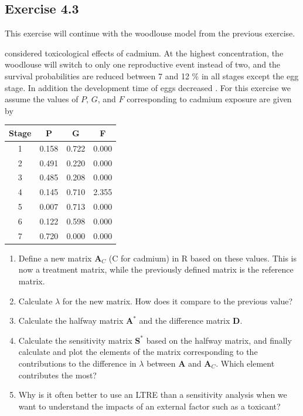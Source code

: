 \documentclass[
]{book}
\begin{document}
\hypertarget{exercise-4.3}{%
\subsection*{Exercise 4.3}\label{exercise-4.3}}

This exercise will continue with the woodlouse model from the previous exercise.

\citet{Kammenga1} considered toxicological effects of cadmium. At the highest concentration, the woodlouse will switch to only one reproductive event instead of two, and the survival probabilities are reduced between 7 and 12 \% in all stages except the egg stage. In addition the development time of eggs decreased \citep{Kammenga1}. For this exercise we assume the values of \(P\), \(G\), and \(F\) corresponding to cadmium exposure are given by

\begin{tabular}{c|c|c|c}
\hline
Stage & P & G & F\\
\hline
1 & 0.158 & 0.722 & 0.000\\
\hline
2 & 0.491 & 0.220 & 0.000\\
\hline
3 & 0.485 & 0.208 & 0.000\\
\hline
4 & 0.145 & 0.710 & 2.355\\
\hline
5 & 0.007 & 0.713 & 0.000\\
\hline
6 & 0.122 & 0.598 & 0.000\\
\hline
7 & 0.720 & 0.000 & 0.000\\
\hline
\end{tabular}

\begin{enumerate}
\def\labelenumi{\arabic{enumi}.}
\item
  Define a new matrix \(\mathbf{A}_C\) (C for cadmium) in R based on these values. This is now a treatment matrix, while the previously defined matrix is the reference matrix.
\item
  Calculate \(\lambda\) for the new matrix. How does it compare to the previous value?
\item
  Calculate the halfway matrix \(\mathbf{A}^*\) and the difference matrix \(\mathbf{D}\).
\item
  Calculate the sensitivity matrix \(\mathbf{S}^*\) based on the halfway matrix, and finally calculate and plot the elements of the matrix corresponding to the contributions to the difference in \(\lambda\) between \(\mathbf{A}\) and \(\mathbf{A}_C\). Which element contributes the most?
\item
  Why is it often better to use an LTRE than a sensitivity analysis when we want to understand the impacts of an external factor such as a toxicant?
\end{enumerate}
\end{document}
